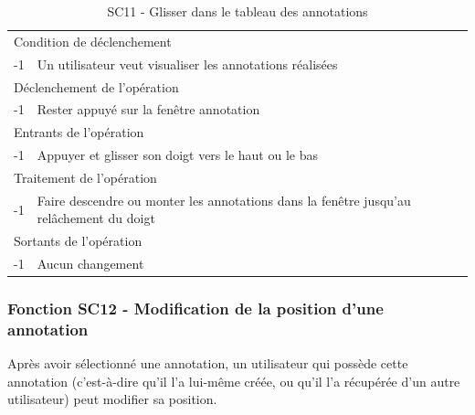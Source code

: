 \documentclass[a4paper]{article}
\begin{document}
\begin{table}[H]
  \centering
   \small
	\begin{tabular}{|c|p{12cm}|}
   		\hline
   			\rowcolor{lightgray}\multicolumn{2}{|c|}{\textbf{SC11 - Glisser dans le tableau des annotations}} \\
   		\hline
   			\multicolumn{2}{|l|}{Condition de d\'eclenchement} \\
   		\hline
   			-1 & Un utilisateur veut visualiser les annotations réalisées\\
   		\hline
   			\multicolumn{2}{|l|}{D\'eclenchement de l'op\'eration} \\
   		\hline
   			-1 & Rester appuyé sur la fenêtre annotation\\
   		\hline
   			\multicolumn{2}{|l|}{Entrants de l'op\'eration} \\
   		\hline
   			-1 & Appuyer et glisser son doigt vers le haut ou le bas\\
   		\hline
   			\multicolumn{2}{|l|}{Traitement de l'op\'eration} \\
  		\hline
   			-1 & Faire descendre ou monter les annotations dans la fenêtre jusqu’au relâchement du doigt\\
   		\hline
   			\multicolumn{2}{|l|}{Sortants de l'op\'eration} \\
   		\hline
   			-1 & Aucun changement\\
   		\hline
	\end{tabular}
  \caption{SC11 - Glisser dans le tableau des annotations}
  \normalsize
  \label{tab:glisser_tab_annotation}
\end{table}

\subsubsection{Fonction SC12 - Modification de la position d’une annotation}
Après avoir sélectionné une annotation, un utilisateur qui possède cette annotation (c’est-à-dire qu’il l’a lui-même créée, ou qu’il l’a récupérée d’un autre utilisateur) peut modifier sa position.\\
\end{document}
